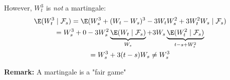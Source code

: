 \noindent However, $W_t^3$ is \textit{not} a martingale:
\begin{equation*}
  \begin{gathered}
    \E(W_t^3\mid\mathcal{F}_s) = \E(W_s^3+(W_t-W_s)^3-3W_tW_s^2+3W_t^2W_s\mid\mathcal{F}_s)\\
    = W_s^3+0-3W_s^2\underbrace{\E(W_t\mid\mathcal{F}_s)}_{W_s} + 3W_s\underbrace{\E(W_t^2\mid\mathcal{F}_s)}_{t-s+W_s^2}\\
    = W_s^3+3(t-s)W_s\neq W_s^3
  \end{gathered}
\end{equation*}
\par\bigskip
\noindent\textbf{Remark:} A martingale is a "fair game"

